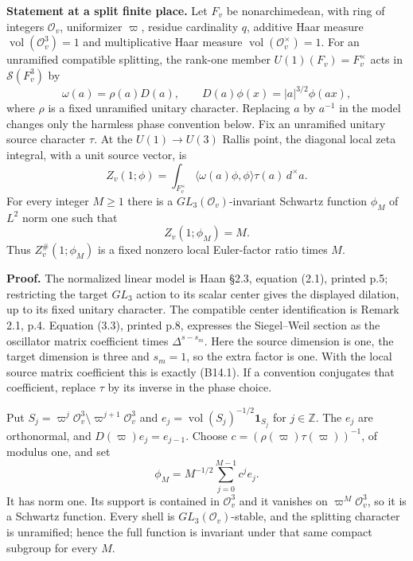 \textbf{Statement at a split finite place.} Let \(F_v\) be nonarchimedean, with ring of integers \(\mathcal O_v\), uniformizer \(\varpi\), residue cardinality \(q\), additive Haar measure \(\operatorname{vol}(\mathcal O_v^3)=1\) and multiplicative Haar measure \(\operatorname{vol}(\mathcal O_v^\times)=1\). For an unramified compatible splitting, the rank-one member \(U(1)(F_v)=F_v^\times\) acts in \(\mathcal S(F_v^3)\) by \[
 \omega(a)=\rho(a)D(a),\qquad
 D(a)\phi(x)=|a|^{3/2}\phi(ax),
\] where \(\rho\) is a fixed unramified unitary character. Replacing \(a\) by \(a^{-1}\) in the model changes only the harmless phase convention below. Fix an unramified unitary source character \(\tau\). At the \(U(1)\to U(3)\) Rallis point, the diagonal local zeta integral, with a unit source vector, is \[
 Z_v(1;\phi)=\int_{F_v^\times}
       \langle\omega(a)\phi,\phi\rangle\tau(a)\,d^\times a.
\tag{B14.1}
\] For every integer \(M\ge1\) there is a \(GL_3(\mathcal O_v)\)-invariant Schwartz function \(\phi_M\) of \(L^2\) norm one such that \[
 Z_v(1;\phi_M)=M.
\tag{B14.2}
\] Thus \(Z_v^\#(1;\phi_M)\) is a fixed nonzero local Euler-factor ratio times \(M\).

\textbf{Proof.} The normalized linear model is Haan §2.3, equation (2.1), printed p.5; restricting the target \(GL_3\) action to its scalar center gives the displayed dilation, up to its fixed unitary character. The compatible center identification is Remark 2.1, p.4. Equation (3.3), printed p.8, expresses the Siegel--Weil section as the oscillator matrix coefficient times \(\Delta^{s-s_m}\). Here the source dimension is one, the target dimension is three and \(s_m=1\), so the extra factor is one. With the local source matrix coefficient this is exactly (B14.1). If a convention conjugates that coefficient, replace \(\tau\) by its inverse in the phase choice.

Put \(S_j=\varpi^j\mathcal O_v^3\setminus\varpi^{j+1}\mathcal O_v^3\) and \(e_j=\operatorname{vol}(S_j)^{-1/2}\mathbf1_{S_j}\) for \(j\in\mathbb Z\). The \(e_j\) are orthonormal, and \(D(\varpi)e_j=e_{j-1}\). Choose \(c=(\rho(\varpi)\tau(\varpi))^{-1}\), of modulus one, and set \[
 \phi_M=M^{-1/2}\sum_{j=0}^{M-1}c^j e_j.
\] It has norm one. Its support is contained in \(\mathcal O_v^3\) and it vanishes on \(\varpi^M\mathcal O_v^3\), so it is a Schwartz function. Every shell is \(GL_3(\mathcal O_v)\)-stable, and the splitting character is unramified; hence the full function is invariant under that same compact subgroup for every \(M\).

